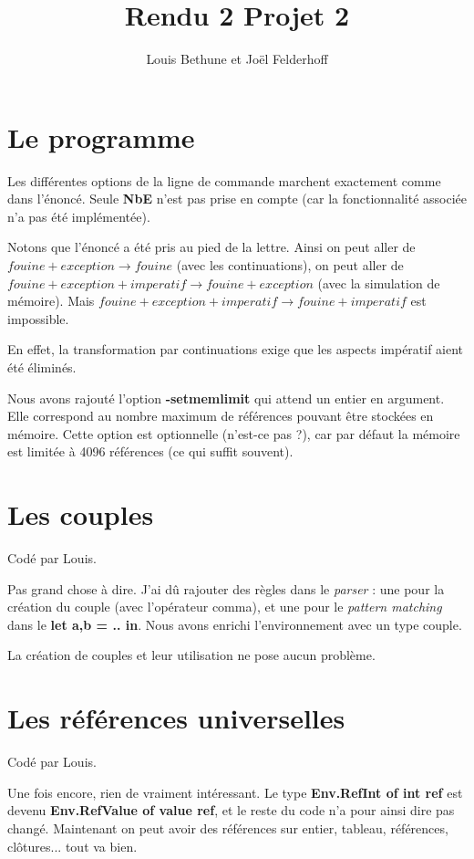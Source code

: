 \documentclass[a4paper,10pt]{report}
\title{Rendu 2 Projet 2}
\author{Louis Bethune et Jo\"el Felderhoff}
\date{}
\begin{document}
\maketitle

\section{Le programme}

Les différentes options de la ligne de commande marchent exactement comme dans l'énoncé. Seule \textbf{NbE} n'est pas prise en compte (car la fonctionnalité associée n'a pas été implémentée).

Notons que l'énoncé a été pris au pied de la lettre. Ainsi on peut aller de $fouine + exception \rightarrow fouine$ (avec les continuations), on peut aller de $fouine + exception + imperatif \rightarrow fouine + exception$ (avec la simulation de mémoire). Mais $fouine + exception + imperatif \rightarrow fouine + imperatif$ est impossible.  
  
En effet, la transformation par continuations exige que les aspects impératif aient été éliminés.  
  
Nous avons rajouté l'option \textbf{-setmemlimit} qui attend un entier en argument. Elle correspond au nombre maximum de références pouvant être stockées en mémoire. Cette option est optionnelle (n'est-ce pas ?), car par défaut la mémoire est limitée à 4096 références (ce qui suffit souvent).   
  
\section{Les couples}

Codé par Louis.  
  
Pas grand chose à dire. J'ai dû rajouter des règles dans le \textit{parser} : une pour la création du couple (avec l'opérateur comma), et une pour le \textit{pattern matching} dans le \textbf{let a,b  = .. in}. Nous avons enrichi l'environnement avec un type couple.  
  
La création de couples et leur utilisation ne pose aucun problème.  
  
\section{Les références universelles}  

Codé par Louis.  
  
Une fois encore, rien de vraiment intéressant. Le type \textbf{Env.RefInt of int ref} est devenu \textbf{Env.RefValue of value ref}, et le reste du code n'a pour ainsi dire pas changé. Maintenant on peut avoir des références sur entier, tableau, références, clôtures... tout va bien.  
  
\end{document}
